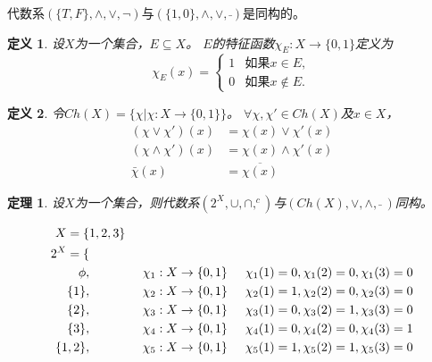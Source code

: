 \documentclass{book}[oneside]
\newtheorem{Def}{定义}[chapter]
\newtheorem{Thm}{定理}[chapter]
\begin{document}
\begin{CJK*}{UTF8}{gbsn}
代数系$(\{T,F\},\land,\lor,\lnot)$与$(\{1,0\},\land, \lor,\bar{ })$是同构的。
  \begin{Def}
    设$X$为一个集合，$E \subseteq X$。 $E$的特征函数$\chi_E:X\to \{0,1\}$定义为
    \begin{equation*}
      \chi_E(x)=
      \begin{cases}
        1 & \text{如果} x \in E,\\
        0 & \text{如果} x \notin E.
      \end{cases}
    \end{equation*}
  \end{Def}
  \begin{Def}
    令$Ch(X) = \{\chi |\chi:X \to \{0,1\}\}$。
    $\forall \chi, \chi' \in Ch(X)$及$x \in X$，
    \begin{align}
      (\chi \lor \chi')(x) &= \chi(x) \lor \chi'(x)\nonumber\\
      (\chi \land \chi')(x) &= \chi(x) \land \chi'(x)\nonumber\\
      \bar{\chi}(x) &=   \overline{\chi(x)}
    \end{align}
  \end{Def}
  \begin{Thm}
    设$X$为一个集合，则代数系$(2^X, \cup, \cap, ^c)$与$(Ch(X), \lor, \land, \bar{} \ )$同构。
  \end{Thm}
  \begin{align*}
    X=\{&1,2,3\}\\
    2^X=\{&\\
        \phi,&\hspace{1.5cm}\chi_1:X\to \{0,1\}\hspace{0.5cm} \chi_1(1)=0,\chi_1(2)=0,\chi_1(3)=0\\
    \{1\},&\hspace{1.5cm}\chi_2:X\to \{0,1\}\hspace{0.5cm} \chi_2(1)=1,\chi_2(2)=0,\chi_2(3)=0\\
        \{2\},&\hspace{1.5cm}\chi_3:X\to \{0,1\}\hspace{0.5cm} \chi_3(1)=0,\chi_3(2)=1,\chi_3(3)=0\\
    \{3\},&\hspace{1.5cm}\chi_4:X\to \{0,1\}\hspace{0.5cm} \chi_4(1)=0,\chi_4(2)=0,\chi_4(3)=1\\
    \{1,2\},&\hspace{1.5cm}\chi_5:X\to \{0,1\}\hspace{0.5cm} \chi_5(1)=1,\chi_5(2)=1,\chi_5(3)=0\\

\end{align*}
\end{CJK*}
\end{document}
